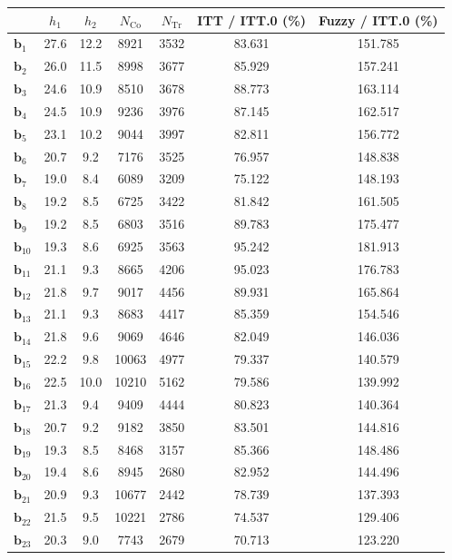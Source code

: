 \documentclass[10pt]{article}
\newcommand{\bb}{\mathbf{b}}
\begin{document}
\begin{table}[p]
    \centering
\begin{tabular}{lcccccc}
  \toprule\toprule
   & $h_1$ & $h_2$ & $N_{\mathrm{Co}}$ & $N_{\mathrm{Tr}}$ & ITT / ITT.0 (\%) & Fuzzy / ITT.0 (\%) \\
  \midrule
   $\bb_{1}$ & 27.6 & 12.2 & 8921 & 3532 & 83.631 & 151.785\\
   $\bb_{2}$ & 26.0 & 11.5 & 8998 & 3677 & 85.929 & 157.241\\
   $\bb_{3}$ & 24.6 & 10.9 & 8510 & 3678 & 88.773 & 163.114\\
   $\bb_{4}$ & 24.5 & 10.9 & 9236 & 3976 & 87.145 & 162.517\\
   $\bb_{5}$ & 23.1 & 10.2 & 9044 & 3997 & 82.811 & 156.772\\
   $\bb_{6}$ & 20.7 & 9.2 & 7176 & 3525 & 76.957 & 148.838\\
   $\bb_{7}$ & 19.0 & 8.4 & 6089 & 3209 & 75.122 & 148.193\\
   $\bb_{8}$ & 19.2 & 8.5 & 6725 & 3422 & 81.842 & 161.505\\
   $\bb_{9}$ & 19.2 & 8.5 & 6803 & 3516 & 89.783 & 175.477\\
   $\bb_{10}$ & 19.3 & 8.6 & 6925 & 3563 & 95.242 & 181.913\\
   $\bb_{11}$ & 21.1 & 9.3 & 8665 & 4206 & 95.023 & 176.783\\
   $\bb_{12}$ & 21.8 & 9.7 & 9017 & 4456 & 89.931 & 165.864\\
   $\bb_{13}$ & 21.1 & 9.3 & 8683 & 4417 & 85.359 & 154.546\\
   $\bb_{14}$ & 21.8 & 9.6 & 9069 & 4646 & 82.049 & 146.036\\
   $\bb_{15}$ & 22.2 & 9.8 & 10063 & 4977 & 79.337 & 140.579\\
   $\bb_{16}$ & 22.5 & 10.0 & 10210 & 5162 & 79.586 & 139.992\\
   $\bb_{17}$ & 21.3 & 9.4 & 9409 & 4444 & 80.823 & 140.364\\
   $\bb_{18}$ & 20.7 & 9.2 & 9182 & 3850 & 83.501 & 144.816\\
   $\bb_{19}$ & 19.3 & 8.5 & 8468 & 3157 & 85.366 & 148.486\\
   $\bb_{20}$ & 19.4 & 8.6 & 8945 & 2680 & 82.952 & 144.496\\
   $\bb_{21}$ & 20.9 & 9.3 & 10677 & 2442 & 78.739 & 137.393\\
   $\bb_{22}$ & 21.5 & 9.5 & 10221 & 2786 & 74.537 & 129.406\\
   $\bb_{23}$ & 20.3 & 9.0 & 7743 & 2679 & 70.713 & 123.220\\

\end{tabular}
\end{table}
\end{document}
